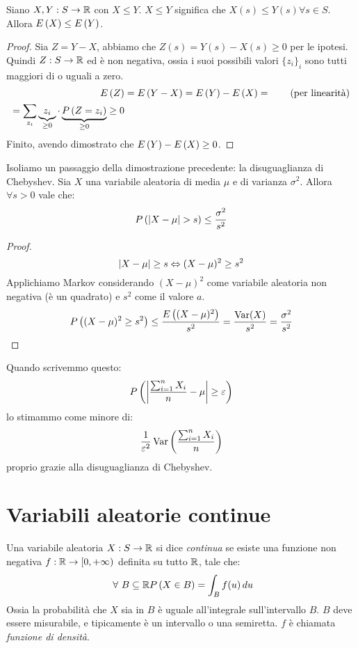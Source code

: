 \begin{lem}\label{monotonia_valore_atteso}
Siano $X, Y : S \to \mathbb{R}$ con $X \le Y$. $X \le Y$ significa che $X(s) \le Y(s) \forall s \in S$. Allora $E \left( X \right) \le E \left( Y \right)$.
\end{lem}
\begin{proof}
Sia $Z = Y - X$, abbiamo che $Z(s) = Y(s) - X(s) \ge 0$ per le ipotesi. Quindi $Z : S \to \mathbb{R}$ ed \`e non negativa, ossia i suoi possibili valori $\{ z_i \}_{i}$ sono tutti maggiori di o uguali a zero.
\begin{align*}
E \left( Z \right) &= E \left( Y - X \right) = E \left( Y \right) - E \left( X \right) = \tag{per linearit\`a} \\
= \sum_{z_i} \underbrace{z_i}_{\ge 0} \cdot \underbrace{P \left( {Z = z_i} \right)}_{\ge 0} \ge 0
\end{align*}
Finito, avendo dimostrato che $E \left( Y \right) - E \left( X \right) \ge 0$.
\end{proof}

Isoliamo un passaggio della dimostrazione precedente: la disuguaglianza di Chebyshev. Sia $X$ una variabile aleatoria di media $\mu$ e di varianza $\sigma^2$. Allora $\forall s > 0$ vale che:
\[
P \left( {\left\lvert{X - \mu}\right\rvert > s} \right) \le \frac{\sigma^2}{s^2}
\]
\begin{proof}
\[
\left\lvert{X - \mu}\right\rvert \ge s \Leftrightarrow (X - \mu)^2 \ge s^2
\]
Applichiamo Markov considerando $(X - \mu)^2$ come variabile aleatoria non negativa (\`e un quadrato) e $s^2$ come il valore $a$.
\[
P \left( {(X - \mu)^2 \ge s^2} \right) \le \frac{E \left( (X - \mu)^2 \right)}{s^2} = \frac{\operatorname{Var} (X)}{s^2} = \frac{\sigma^2}{s^2}
\]
\end{proof}

Quando scrivemmo questo:
\[
P \left( {\left\lvert{\frac{\sum_{i = 1}^{n} X_i}{n} - \mu}\right\rvert \ge \varepsilon} \right)
\]
lo stimammo come minore di:
\[
\frac{1}{\varepsilon^2} \operatorname{Var} \left( \frac{\sum_{i = 1}^{n} X_i}{n} \right)
\]
proprio grazie alla disuguaglianza di Chebyshev.

\section{Variabili aleatorie continue}

\begin{defn}
Una variabile aleatoria $X : S \to \mathbb{R}$ si dice \emph{continua} se esiste una funzione non negativa $f : \mathbb{R} \to \left[ 0, + \infty \right)$ definita su tutto $\mathbb{R}$, tale che:
\[
\forall B \subseteq \reals \prob{X \in B} = \int_{B} f(u) \, du
\]
Ossia la probabilit\`a che $X$ sia in $B$ \`e uguale all'integrale sull'intervallo $B$. $B$ deve essere misurabile, e tipicamente \`e un intervallo o una semiretta. $f$ \`e chiamata \emph{funzione di densit\`a}.
\end{defn}

